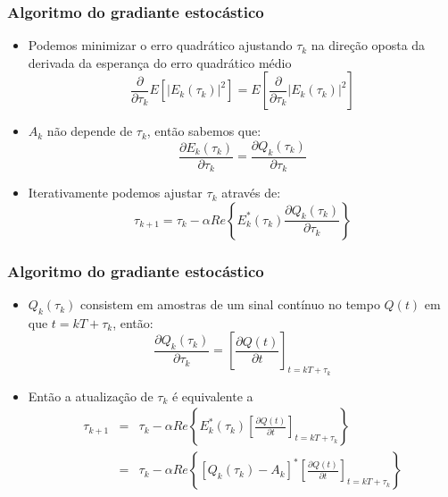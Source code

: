 \begin{frame}
	\frametitle{Algoritmo do gradiante estocástico}
	\begin{itemize}
		\item Podemos minimizar o erro quadrático ajustando $\tau_k$ na direção oposta da derivada da esperança do erro quadrático médio
		\begin{equation*}
			\frac{\partial}{\partial \tau_k} E[|E_k(\tau_k)|^2] = E\left[\frac{\partial}{\partial\tau_k}|E_k(\tau_k)|^2\right]
		\end{equation*}
		\item $A_k$ não depende de $\tau_k$, então sabemos que:
		\begin{equation*}
		\frac{\partial E_k(\tau_k)}{\partial\tau_k} = \frac{\partial Q_k(\tau_k)}{\partial\tau_k} 
		\end{equation*}
		\item Iterativamente podemos ajustar $\tau_k$ através de:
		\begin{equation*}
		\tau_{k+1} = \tau_k - \alpha Re \left\{ E_k^*(\tau_k) \frac{\partial Q_k(\tau_k)}{\partial \tau_k} \right\}
		\end{equation*}
	\end{itemize}			
\end{frame}

\begin{frame}
	\frametitle{Algoritmo do gradiante estocástico}
	\begin{itemize}
		\item $Q_k(\tau_k)$ consistem em amostras de um sinal contínuo no tempo $Q(t)$ em que $t = kT+\tau_k$, então:
		\begin{equation*}
		\frac{\partial Q_k(\tau_k)}{\partial \tau_k} = \left[\frac{\partial Q(t)}{\partial t}\right]_{t = kT + \tau_k}
		\end{equation*}
		\item Então a atualização de $\tau_k$ é equivalente a
		\begin{eqnarray*}
			\tau_{k+1} & = & \tau_k -\alpha Re\left\{ E_k^*(\tau_k) \left[\frac{\partial Q(t)}{\partial t}\right]_{t = kT+\tau_k}\right\} \\
			& = & \tau_k -\alpha Re\left\{ \left[Q_k(\tau_k) - A_k\right]^* \left[\frac{\partial Q(t)}{\partial t}\right]_{t = kT+\tau_k}\right\}
		\end{eqnarray*}
	\end{itemize}			
\end{frame}


